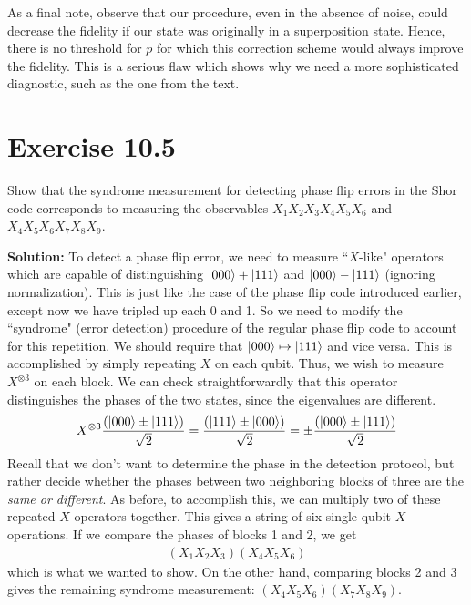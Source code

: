 \documentclass{book}
\begin{document}
    As a final note, observe that our procedure, even in the absence of noise, could decrease the fidelity if our state was originally in a superposition state. Hence, there is no threshold for $p$ for which this correction scheme would always improve the fidelity. This is a serious flaw which shows why we need a more sophisticated diagnostic, such as the one from the text.
    
\section*{Exercise 10.5}
    Show that the syndrome measurement for detecting phase flip errors in the Shor code corresponds to measuring the observables $X_1 X_2 X_3 X_4 X_5 X_6$ and $X_4 X_5 X_6 X_7 X_8 X_9$.
    
    \textbf{Solution:} To detect a phase flip error, we need to measure ``$X$-like" operators which are capable of distinguishing $\ket{000} + \ket{111}$ and $\ket{000} - \ket{111}$ (ignoring normalization). This is just like the case of the phase flip code introduced earlier, except now we have tripled up each 0 and 1. So we need to modify the ``syndrome" (error detection) procedure of the regular phase flip code to account for this repetition. We should require that $\ket{000} \mapsto \ket{111}$ and vice versa. This is accomplished by simply repeating $X$ on each qubit. Thus, we wish to measure $X^{\otimes 3}$ on each block. We can check straightforwardly that this operator distinguishes the phases of the two states, since the eigenvalues are different.
    \begin{align}
        X^{\otimes 3} \frac{ \left(\ket{000} \pm \ket{111}\right)}{\sqrt{2}} = \frac{\left(\ket{111} \pm \ket{000}\right)}{\sqrt{2}} = \pm \frac{ \left(\ket{000} \pm \ket{111}\right)}{\sqrt{2}}
    \end{align}
    Recall that we don't want to determine the phase in the detection protocol, but rather decide whether the phases between two neighboring blocks of three are the \emph{same or different}. As before, to accomplish this, we can multiply two of these repeated $X$ operators together. This gives a string of six single-qubit $X$ operations. If we compare the phases of blocks 1 and 2, we get
    \begin{align}
        (X_1 X_2 X_3) (X_4 X_5 X_6)
    \end{align}
    which is what we wanted to show. On the other hand, comparing blocks 2 and 3 gives the remaining syndrome measurement: $(X_4 X_5 X_6) (X_7 X_8 X_9)$.
\end{document}
